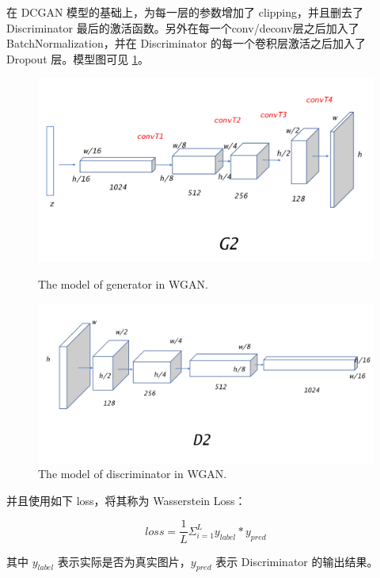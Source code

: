 \documentclass{article}
\begin{document}
\begin{CJK*}{UTF8}{gbsn}
	在 DCGAN 模型的基础上，为每一层的参数增加了 clipping，并且删去了 Discriminator 最后的激活函数。另外在每一个conv/deconv层之后加入了 BatchNormalization，并在 Discriminator 的每一个卷积层激活之后加入了 Dropout 层。模型图可见 \ref{fig_wgan_model}。

	\begin{figure}[htbp]
		\begin{minipage}{0.5\linewidth}
			\label{fig_wgan_model}
			\centering\includegraphics[scale=0.13]{res/WGAN_generator.png}
			\caption{The model of generator in WGAN.}
		\end{minipage}
		\begin{minipage}{0.5\linewidth}
			\centering\includegraphics[scale=0.13]{res/WGAN_discriminator.png}
			\caption{The model of discriminator in WGAN.}
		\end{minipage}
	\end{figure}
  
	并且使用如下 loss，将其称为 Wasserstein Loss：
	
	\begin{equation}
		loss = \frac{1}{L} \Sigma_{i=1}^L y_{label} * y_{pred} 
	\end{equation}
	
	其中 $y_{label}$ 表示实际是否为真实图片，$y_{pred}$ 表示 Discriminator 的输出结果。


\end{CJK*}
\end{document}

